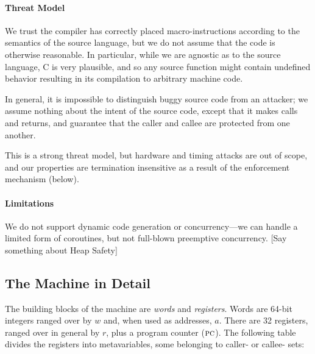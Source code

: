 \documentclass[10pt,conference]{ieeetran}%
\theoremstyle{definition}
\begin{document}

\paragraph*{Threat Model}

We trust the compiler has correctly placed macro-instructions according to
the semantics of the source language, but we do not assume that the code
is otherwise reasonable. In particular, while we are agnostic as to the source
language, C is very plausible, and so any source function might contain undefined
behavior resulting in its compilation to arbitrary machine code.

In general, it is impossible to distinguish buggy source code from an attacker;
we assume nothing about the intent of the source code, except that it makes calls
and returns, and guarantee that the caller and callee are protected from one
another.

This is a strong threat model, but hardware and timing attacks are out of scope,
and our properties are termination insensitive as a result of the enforcement mechanism
(below).

\paragraph*{Limitations}

We do not support dynamic code generation or concurrency---we can handle a
limited form of coroutines, but not full-blown preemptive concurrency.
[Say something about Heap Safety]
  
\subsection{The Machine in Detail}
\label{sec:prelim}

The building blocks of the machine are {\em words} and {\em registers}.
Words are 64-bit integers ranged over by \(w\) and, when used as addresses,
\(a\). There are 32 registers, ranged over in general by \(r\),
plus a program counter (\(\textsc{pc}\)). The following table divides
the registers into metavariables, some belonging to caller- or callee- sets:
\end{document}

